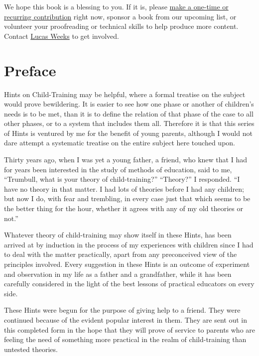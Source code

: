 \documentclass[
]{book}
\begin{document}
We hope this book is a blessing to you. If it is, please \href{https://warhornmedia.com/give}{make a one-time or recurring contribution} right now, sponsor a book from our upcoming list, or volunteer your proofreading or technical skills to help produce more content. Contact \href{mailto:lucas@beggarsborn.com}{Lucas Weeks} to get involved.

\clearpage
\setcounter{page}{1}

\hypertarget{preface}{%
\chapter{Preface}\label{preface}}

Hints on Child-Training may be helpful, where a formal treatise on the subject would prove bewildering. It is easier to see how one phase or another of children's needs is to be met, than it is to define the relation of that phase of the case to all other phases, or to a system that includes them all. Therefore it is that this series of Hints is ventured by me for the benefit of young parents, although I would not dare attempt a systematic treatise on the entire subject here touched upon.

Thirty years ago, when I was yet a young father, a friend, who knew that I had for years been interested in the study of methods of education, said to me, ``Trumbull, what is your theory of child-training?'' ``Theory?'' I responded. ``I have no theory in that matter. I had lots of theories before I had any children; but now I do, with fear and trembling, in every case just that which seems to be the better thing for the hour, whether it agrees with any of my old theories or not.''

Whatever theory of child-training may show itself in these Hints, has been arrived at by induction in the process of my experiences with children since I had to deal with the matter practically, apart from any preconceived view of the principles involved. Every suggestion in these Hints is an outcome of experiment and observation in my life as a father and a grandfather, while it has been carefully considered in the light of the best lessons of practical educators on every side.

These Hints were begun for the purpose of giving help to a friend. They were continued because of the evident popular interest in them. They are sent out in this completed form in the hope that they will prove of service to parents who are feeling the need of something more practical in the realm of child-training than untested theories.
\end{document}
